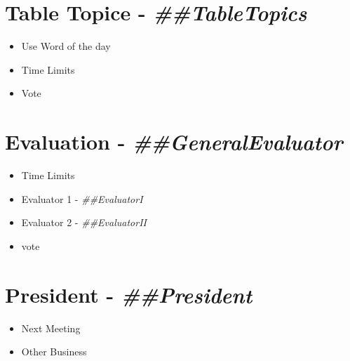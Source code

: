 \documentclass{article}
\newcommand{\president}{##President}
\newcommand{\tableTopics}{##TableTopics}
\newcommand{\generalEvaluator}{##GeneralEvaluator}
\newcommand{\evaluatorI}{##EvaluatorI}
\newcommand{\evaluatorII}{##EvaluatorII}
\begin{document}
\section*{Table Topice - \textit{\tableTopics{}}} 
\begin{itemize}
 \item Use Word of the day
 \item Time Limits
 \item Vote
\end{itemize}

\section*{Evaluation - \textit{\generalEvaluator{}}} 
\begin{itemize}
  \item Time Limits
  \item Evaluator 1 - \textit{\evaluatorI{}}
  \item Evaluator 2 - \textit{\evaluatorII{}}
  \item vote
\end{itemize}


\section*{President - \textit{\president{}}} 
\begin{itemize}
  \item Next Meeting
  \item Other Business
\end{itemize}
\end{document}
